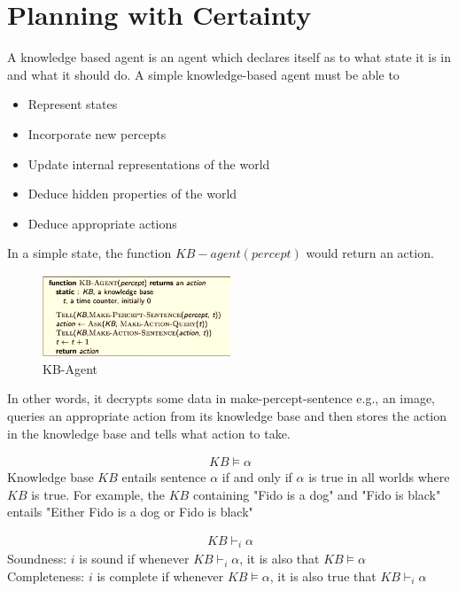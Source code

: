 \documentclass[a4paper]{article}
\theoremstyle{plain}
\theoremstyle{definition}
\newtheorem{defn}{Definition}[section]
\theoremstyle{remark}
\begin{document}
\section{Planning with Certainty}
A knowledge based agent is an agent which declares itself as to what state it is in and what it should do. A simple knowledge-based agent must be able to
\begin{itemize}
	\item Represent states
	\item Incorporate new percepts
	\item Update internal representations of the world
	\item Deduce hidden properties of the world
	\item Deduce appropriate actions
\end{itemize}
In a simple state, the function $KB-agent(percept)$ would return an action.
\begin{figure}[H]
	\centering
	\includegraphics[width=0.5\textwidth]{nine.png}
	\caption{KB-Agent}
	\label{fig:nine-png}
\end{figure}
In other words, it decrypts some data in make-percept-sentence e.g., an image, queries an appropriate action from its knowledge base and then stores the action in the knowledge base and tells what action to take.
\begin{tcolorbox}[colback=black!3!white,colframe=black!60!white,title=\begin{defn}Entailment \label{Entailment}\end{defn}]
\begin{align}
KB \vDash \alpha
\end{align}
Knowledge base $KB$ entails sentence $\alpha$ if and only if $\alpha$ is true in all worlds where $KB$ is true. For example, the $KB$ containing "Fido is a dog" and "Fido is black" entails "Either Fido is a dog or Fido is black"
\end{tcolorbox}
\begin{tcolorbox}[colback=black!3!white,colframe=black!60!white,title=\begin{defn}Inference \label{Inference}\end{defn}]
\begin{align}
KB \vdash_i \alpha
\end{align}
Soundness: $i$ is sound if whenever $KB \vdash_i \alpha$, it is also that $KB \vDash \alpha$ \\
Completeness: $i$ is complete if whenever $KB \vDash \alpha$, it is also true that $KB \vdash_i \alpha$
\end{tcolorbox}
\end{document}
